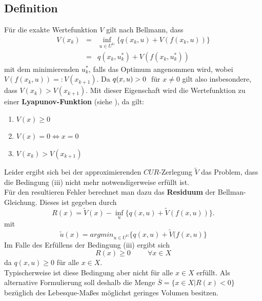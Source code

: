 \documentclass[12pt,a4paper,twoside]{article}
\begin{document}
\subsection{Definition}
	Für die exakte Wertefunktion $V$ gilt nach Bellmann, dass
	\begin{eqnarray*}
		V(x_k)&=&\inf_{u\in U^{\mathds{N}}}\{q(x_k,u)+V(f(x_k,u))\} \\
			&=&q(x_k,u_k^*)+V(f(x_k,u_k^*))
	\end{eqnarray*}
	mit dem minimierenden $u_k^*$, falls das Optimum angenommen wird, wobei $V(f(x_k,u))=:V(x_{k+1})$. Da $q(x,u)>0 \hspace{1mm}$ für $x\neq 0$ gilt also insbesondere, dass $V(x_k)>V(x_{k+1})$. \newline
	\newline
	Mit dieser Eigenschaft wird die Wertefunktion zu einer \textbf{Lyapunov-Funktion} (siehe \citep{Wiggins1990}), da gilt:
	\begin{enumerate}
		\item $V(x)\geq 0$ 
		\item $V(x)=0 \Leftrightarrow x=0$
		\item $V(x_k)>V(x_{k+1})$
	\end{enumerate}
	Leider ergibt sich bei der approximierenden $CUR$-Zerlegung $\tilde{V}$ das Problem, dass die Bedingung (iii) nicht 
	mehr notwendigerweise erfüllt ist. \\
	Für den resultieren Fehler berechnet man dazu das \textbf{Residuum} der Bellman-Gleichung. Dieses ist gegeben 
	durch
	\begin{equation}
		\label{eq:residuum}
		R(x)=\tilde{V}(x)-\inf_{u}\{q(x,u)+\tilde{V}(f(x,u))\}.
	\end{equation}
	mit
	\begin{equation}
		\tilde{u}(x)=argmin_{u\in U^{\mathds{N}}}\{q(x,u)+\tilde{V}(f(x,u)\}
	\end{equation}
	Im Falle des Erfüllens der Bedingung (iii) ergibt sich
	\begin{equation}
		R(x)\geq 0 \hspace{1cm}\forall x\in X
	\end{equation}
	da $q(x,u)\geq0$ für alle $x\in X$. \\
	Typischerweise ist diese Bedingung aber nicht für alle $x\in X$ erfüllt. Als alternative Formulierung soll 
	deshalb die Menge $\bar{S}=\{x\in X| R(x)<0\}$ bezüglich des Lebesque-Maßes möglichst geringes Volumen besitzen.
\end{document}
